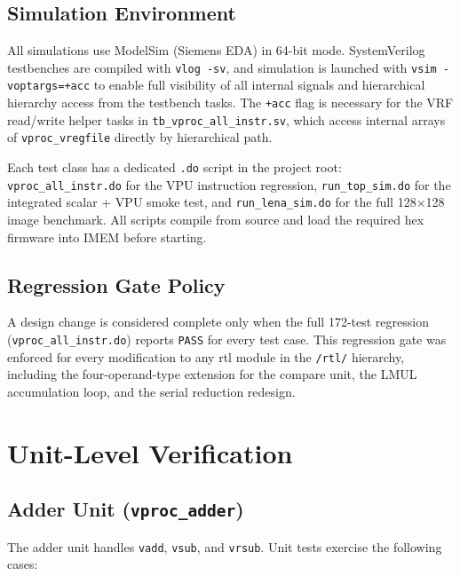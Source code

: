\subsection{Simulation Environment}

All simulations use ModelSim (Siemens EDA) in 64-bit mode. SystemVerilog testbenches
are compiled with \texttt{vlog -sv}, and simulation is launched with
\texttt{vsim -voptargs=+acc} to enable full visibility of all internal signals and
hierarchical hierarchy access from the testbench tasks. The \texttt{+acc} flag is
necessary for the VRF read/write helper tasks in \texttt{tb\_vproc\_all\_instr.sv},
which access internal arrays of \texttt{vproc\_vregfile} directly by hierarchical path.

Each test class has a dedicated \texttt{.do} script in the project root:
\texttt{vproc\_all\_instr.do} for the VPU instruction regression,
\texttt{run\_top\_sim.do} for the integrated scalar + VPU smoke test, and
\texttt{run\_lena\_sim.do} for the full 128$\times$128 image benchmark. All scripts
compile from source and load the required hex firmware into IMEM before starting.

\subsection{Regression Gate Policy}

A design change is considered complete only when the full 172-test regression
(\texttt{vproc\_all\_instr.do}) reports \texttt{PASS} for every test case. This
regression gate was enforced for every modification to any \gls{rtl} module in the
\texttt{/rtl/} hierarchy, including the four-operand-type extension for the compare
unit, the LMUL accumulation loop, and the serial reduction redesign.

\section{Unit-Level Verification}
\label{sec:unit_verif}

\subsection{Adder Unit (\texttt{vproc\_adder})}

The adder unit handles \texttt{vadd}, \texttt{vsub}, and \texttt{vrsub}. Unit tests
exercise the following cases:


